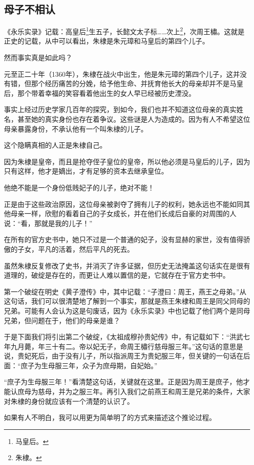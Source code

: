 \begin{multicols}{\theparacolNo}
\subsection{母子不相认}
《永乐实录》记载：高皇后\footnote{马皇后。}生五子，长懿文太子标……次上\footnote{朱棣。}，次周王橚。这就是正史的记载，从中可以看出，朱棣是朱元璋和马皇后的第四个儿子。

然而事实真是如此吗？

元至正二十年（1360年），朱棣在战火中出生，他是朱元璋的第四个儿子，这并没有错，但那个经历痛苦的分娩，给予他生命、并抚育他长大的母亲却并不是马皇后，那个带着幸福的笑容看着他出生的女人早已经被历史湮没。

事实上经过历史学家几百年的探究，到如今，我们也并不知道这位母亲的真实姓名，甚至她的真实身份也存在着争议。这些谜是人为造成的。因为有人不希望这位母亲暴露身份，不承认他有一个叫朱棣的儿子。

这个隐瞒真相的人正是朱棣自己。

因为朱棣是皇帝，而且是抢夺侄子皇位的皇帝，所以他必须是马皇后的儿子，因为只有这样，他才是嫡出，才有足够的资本去继承皇位。

他绝不能是一个身份低贱妃子的儿子，绝对不能！

正是由于这些政治原因，这位母亲被剥夺了拥有儿子的权利，她永远也不能如同其他母亲一样，欣慰的看着自己的子女成长，并在他们长成后自豪的对周围的人说：“看，那就是我的儿子！”

在所有的官方史书中，她只不过是一个普通的妃子，没有显赫的家世，没有值得骄傲的子女，平凡的活着，然后平凡的死去。

虽然朱棣反复修改了史书，并消灭了许多证据，但历史无法掩盖这句话实在是很有道理的，破绽是存在的，而更让人难以置信的是，它就存在于官方史书中。

第一个破绽在明史《黄子澄传》中，其中记载：“子澄曰：周王，燕王之母弟。”从这句话，我们可以很清楚地了解到一个事实，那就是燕王朱棣和周王是同父同母的兄弟。可能有人会认为这是句废话，因为《永乐实录》中也记载了他们两个是同母兄弟，但问题在于，他们的母亲是谁？

于是下面我们将引出第二个破绽，《太祖成穆孙贵妃传》中，有记载如下：“洪武七年九月薨，年三十有二。帝以妃无子，命周王橚行慈母服三年。”这句话的意思是说，贵妃死后，由于没有儿子，所以指派周王为贵妃服三年，但关键的一句话在后面：“庶子为生母服三年，众子为庶母期，自妃始。”

“庶子为生母服三年！”看清楚这句话，关键就在这里。正是因为周王是庶子，他才能认庶母为慈母，并为之服三年。再引入我们之前燕王和周王是兄弟的条件，大家对朱棣的身份就应该有一个清楚的认识了。

如果有人不明白，我可以用更为简单明了的方式来描述这个推论过程。


\end{multicols}
